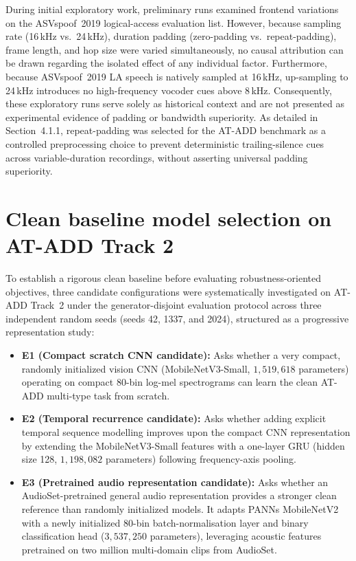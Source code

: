 \documentclass[12pt,a4paper]{report}
\begin{document}
During initial exploratory work, preliminary runs examined frontend variations on the ASVspoof~2019 logical-access evaluation list. However, because sampling rate (16\,kHz vs.\ 24\,kHz), duration padding (zero-padding vs.\ repeat-padding), frame length, and hop size were varied simultaneously, no causal attribution can be drawn regarding the isolated effect of any individual factor. Furthermore, because ASVspoof~2019 LA speech is natively sampled at 16\,kHz, up-sampling to 24\,kHz introduces no high-frequency vocoder cues above 8\,kHz. Consequently, these exploratory runs serve solely as historical context and are not presented as experimental evidence of padding or bandwidth superiority. As detailed in Section~4.1.1, repeat-padding was selected for the AT-ADD benchmark as a controlled preprocessing choice to prevent deterministic trailing-silence cues across variable-duration recordings, without asserting universal padding superiority.

\section{Clean baseline model selection on AT-ADD Track 2}
\label{sec:backbone-study}

To establish a rigorous clean baseline before evaluating robustness-oriented objectives, three candidate configurations were systematically investigated on AT-ADD Track~2 under the generator-disjoint evaluation protocol across three independent random seeds (seeds 42, 1337, and 2024), structured as a progressive representation study:
\begin{itemize}
  \item \textbf{E1 (Compact scratch CNN candidate):} Asks whether a very compact, randomly initialized vision CNN (MobileNetV3-Small, $1{,}519{,}618$ parameters) operating on compact 80-bin log-mel spectrograms can learn the clean AT-ADD multi-type task from scratch.
  \item \textbf{E2 (Temporal recurrence candidate):} Asks whether adding explicit temporal sequence modelling improves upon the compact CNN representation by extending the MobileNetV3-Small features with a one-layer GRU (hidden size 128, $1{,}198{,}082$ parameters) following frequency-axis pooling.
  \item \textbf{E3 (Pretrained audio representation candidate):} Asks whether an AudioSet-pretrained general audio representation provides a stronger clean reference than randomly initialized models. It adapts PANNs MobileNetV2~\cite{kong2020panns} with a newly initialized 80-bin batch-normalisation layer and binary classification head ($3{,}537{,}250$ parameters), leveraging acoustic features pretrained on two million multi-domain clips from AudioSet.
\end{itemize}
\end{document}
